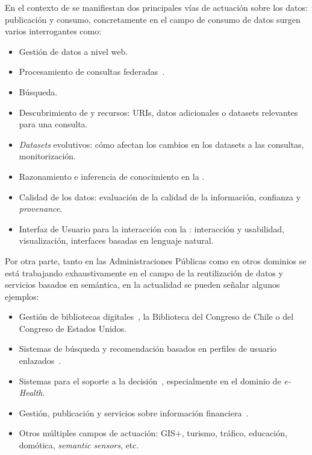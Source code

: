 En el contexto de \linkeddata se manifiestan dos principales vías de actuación sobre los datos: publicación y consumo, concretamente en el campo de consumo de 
datos surgen varios interrogantes como:
\begin{itemize}
\item Gestión de datos a nivel web.
\item Procesamiento de consultas federadas~\cite{sparqlOpt}.
\item Búsqueda.
\item Descubrimiento de \datasets y recursos: URIs, datos adicionales o datasets relevantes para una consulta.
\item \textit{Datasets} evolutivos: cómo afectan los cambios en los datasets a las consultas, monitorización.
\item Razonamiento e inferencia de conocimiento en la \wod.
\item Calidad de los datos: evaluación de la calidad de la información, confianza y \textit{provenance}.
\item Interfaz de Usuario para la interacción con la \wod: interacción y usabilidad, visualización, interfaces basadas en lenguaje natural.
\end{itemize}


Por otra parte, tanto en las Administraciones Públicas como en otros dominios 
se está trabajando exhaustivamente en el campo de la reutilización de datos y servicios basados en semántica, en la actualidad 
se pueden señalar algunos ejemplos:
\begin{itemize}
\item Gestión de bibliotecas digitales~\cite{DBLP:journals/chb/Garcia-CrespoBPS11}, la Biblioteca del Congreso de Chile o del Congreso de Estados Unidos.
\item Sistemas de búsqueda y recomendación basados en perfiles de usuario enlazados~\cite{DBLP:conf/www/LatifAHTM10}.
\item Sistemas para el soporte a la decisión~\cite{DBLP:journals/ijdsst/Garcia-ManotasLSV10}, especialmente en el dominio de \textit{e-Health}.
\item Gestión, publicación y servicios sobre información financiera~\cite{DBLP:journals/eswa/Esteban-GilSVF12,DBLP:conf/iwinac/GomezSVTM09}.
\item Otros múltiples campos de actuación:  \gls{GIS}+\linkeddata, turismo, tráfico, educación, domótica, \textit{semantic sensors}, etc.
\end{itemize}

